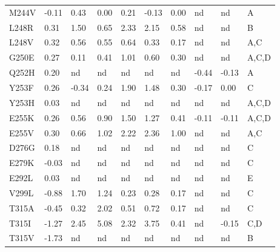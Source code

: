 \documentclass[phd,tocprelim]{cornell}
\begin{document}
\begin{landscape}
\begin{ThreePartTable}
\begin{longtable}[c]{llllllllll}
	
		{M244V} & {-0.11}       & {0.43}        & {0.00}        & {0.21}        & {-0.13}       & {0.00}        & {nd}  		& {nd}  	& {A}       \\
		{L248R} & {0.31}        & {1.50}        & {0.65}        & {2.33}        & {2.15}        & {0.58}        & {nd}  		& {nd}  	& {B}     	\\
		{L248V} & {0.32}        & {0.56}        & {0.55}        & {0.64}        & {0.33}        & {0.17}        & {nd}  		& {nd}  	& {A,C}     \\
		{G250E} & {0.27}        & {0.11}        & {0.41}        & {1.01}        & {0.60}        & {0.30}        & {nd}  		& {nd}  	& {A,C,D}   \\
		{Q252H} & {0.20}        & {nd}  		& {nd}  		& {nd}  		& {nd}  		& {nd}  		& {-0.44}       & {-0.13}	& {A}       \\
		{Y253F} & {0.26}        & {-0.34}       & {0.24}        & {1.90}        & {1.48}        & {0.30}        & {-0.17}       & {0.00}	& {C}       \\
		{Y253H} & {0.03}        & {nd} 			& {nd}  		& {nd}  		& {nd}  		& {nd}  		& {nd}  		& {nd}  	& {A,C,D}   \\
		{E255K} & {0.26}        & {0.56}        & {0.90}        & {1.50}        & {1.27}        & {0.41}        & {-0.11}       & {-0.11}	& {A,C,D}   \\
		{E255V} & {0.30}        & {0.66}        & {1.02}        & {2.22}        & {2.36}        & {1.00}        & {nd}  		& {nd}  	& {A,C}     \\
		{D276G} & {0.18}        & {nd}  		& {nd}  		& {nd}  		& {nd}  		& {nd}  		& {nd}  		& {nd}  	& {C}       \\
		{E279K} & {-0.03}       & {nd}  		& {nd}  		& {nd}  		& {nd}  		& {nd}  		& {nd}  		& {nd}  	& {C}       \\
		{E292L} & {0.03}        & {nd}  		& {nd}  		& {nd}  		& {nd}  		& {nd}  		& {nd}  		& {nd}  	& {E}       \\
		{V299L} & {-0.88}       & {1.70}        & {1.24}        & {0.23}        & {0.28}        & {0.17}        & {nd}  		& {nd}  	& {C}       \\
		{T315A} & {-0.45}       & {0.32}        & {2.02}        & {0.51}        & {0.72}        & {0.17}        & {nd}  		& {nd}  	& {C}       \\
		{T315I} & {-1.27}       & {2.45}        & {5.08}        & {2.32}        & {3.75}        & {0.41}        & {nd}  		& {-0.15}   & {C,D}     \\
		{T315V} & {-1.73}       & {nd}  		& {nd}  		& {nd}  		& {nd}  		& {nd}  		& {nd}  		& {nd}  	& {B}     	\\

\end{longtable}
\end{ThreePartTable}
\end{landscape}
\end{document}
